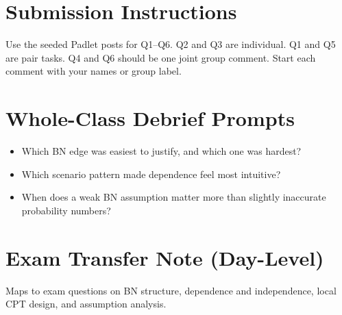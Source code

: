 \documentclass[11pt]{article}
\providecommand{\tightlist}{\setlength{\itemsep}{0pt}\setlength{\parskip}{0pt}}
\begin{document}
\section*{Submission Instructions}

Use the seeded Padlet posts for Q1--Q6. Q2 and Q3 are individual. Q1 and Q5 are pair tasks. Q4 and Q6 should be one joint group comment. Start each comment with your names or group label.

\section*{Whole-Class Debrief Prompts}

\begin{itemize}
\tightlist
\item
  Which BN edge was easiest to justify, and which one was hardest?
\item
  Which scenario pattern made dependence feel most intuitive?
\item
  When does a weak BN assumption matter more than slightly inaccurate probability numbers?
\end{itemize}

\section*{Exam Transfer Note (Day-Level)}

Maps to exam questions on BN structure, dependence and independence, local CPT design, and assumption analysis.
\end{document}
